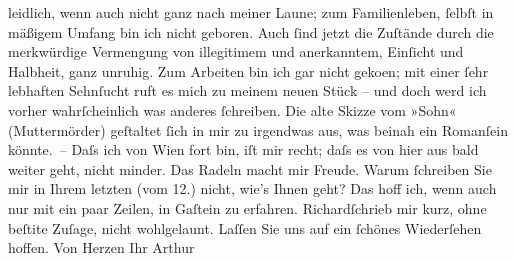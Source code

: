 \begin{ledgroupsized}[t]{13cm}
               leidlich, wenn auch nicht ganz nach meiner Laune; zum Familienleben, {\pb}ſelbſt in mäßigem Umfang bin ich nicht geboren. Auch ſind
               jetzt die Zuſtände durch die merkwürdige Vermengung von illegitimem und anerkanntem,
               Einſicht und Halbheit, ganz unruhig.\pend
           \pstart
           Zum Arbeiten bin ich gar nicht geko{\geminationm}en; mit einer ſehr
               lebhaften Sehnſucht ruft es mich zu meinem neuen Stück – und doch werd ich vorher wahrſcheinlich was anderes
               ſchreiben. Die alte Skizze vom »Sohn«
               (Muttermörder) geſtaltet ſich in mir zu irgendwas aus, was beinah {\pb}ein Romanſein könnte. – Daſs ich von Wien fort bin, iſt mir recht; daſs es von hier aus bald weiter
               geht, nicht minder. Das Radeln macht mir Freude.\pend
           \pstart
           Warum ſchreiben Sie mir in Ihrem letzten \introOben{}(vom
                  12.)\introOben{} nicht, wie’s Ihnen geht? Das hoff ich, wenn auch nur mit
               ein paar Zeilen, in Gaſtein zu erfahren. Richardſchrieb mir kurz, ohne beſti{\geminationm}te Zuſage, nicht wohlgelaunt.\pend
           \pstart
           Laſſen Sie uns auf ein ſchönes Wiederſehen hoffen. Von Herzen Ihr
                  \spacefill\mbox{Arthur}\pend
           
         
         \endnumbering{}\end{ledgroupsized}  \newcommand{\dateiname}{L00820}\newcommand{\titel}{Arthur Schnitzler an Hugo von Hofmannsthal, 15. 7. 1898}\newcommand{\editorInnen}{Martin Anton Müller und Gerd-Hermann Susen}
      